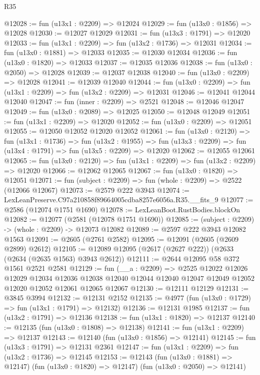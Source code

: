\begin{lexlean}{R35}
\begin{coremodule}
@12028 := fun (u13x1 : @2209) => @12024
@12029 := fun (u13x0 : @1856) => @12028
@12030 := @12027 @12029
@12031 := fun (u13x3 : @1791) => @12020
@12033 := fun (u13x1 : @2209) => fun (u13x2 : @1736) => @12031
@12034 := fun (u13x0 : @1881) => @12033
@12035 := @12030 @12034
@12036 := fun (u13x0 : @1820) => @12033
@12037 := @12035 @12036
@12038 := fun (u13x0 : @2050) => @12028
@12039 := @12037 @12038
@12040 := fun (u13x0 : @2209) => @12028
@12041 := @12039 @12040
@12044 := fun (u13x0 : @2209) => fun (u13x1 : @2209) => fun (u13x2 : @2209) => @12031
@12046 := @12041 @12044 @12040
@12047 := fun (inner : @2209) => @2521
@12048 := @12046 @12047
@12049 := fun (u13x0 : @2089) => @12025
@12050 := @12048 @12049
@12051 := fun (u13x1 : @2209) => @12020
@12052 := fun (u13x0 : @2209) => @12051
@12055 := @12050 @12052 @12020 @12052
@12061 := fun (u13x0 : @2120) =>
  fun (u13x1 : @1736) =>
  fun (u13x2 : @1955) => fun (u13x3 : @2209) => fun (u13x4 : @1791) => fun (u13x5 : @2209) => @12020
@12062 := @12055 @12061
@12065 := fun (u13x0 : @2120) => fun (u13x1 : @2209) => fun (u13x2 : @2209) => @12020
@12066 := @12062 @12065
@12067 := fun (u13x0 : @1820) => @12051
@12071 := fun (subject : @2209) => fun (whole : @2209) => @2522 (@12066 @12067)
@12073 := @2579 @222 @3943
@12074 := LexLeanPreserve.C97a210858f89664005cdba8257e6056a.R35.__fits_9
@12077 := @2586 (@12074 @1751 @1690)
@12078 := LexLeanBoot.RustBodies.blockOn
@12082 := @12077 (@2581 (@12078 @1751 @1690))
@12085 := (subject : @2209) -> (whole : @2209) -> @12073 @12082
@12089 := @2597 @222 @3943 @12082 @1563
@12091 := @2605 (@2761 @2582)
@12095 := @12091 (@2605 (@2609 @2899) @2612)
@12105 := @12089 @12095 (@2617 (@2627 @222)) (@2633 (@2634 (@2635 @1563) @3943 @2612))
@12111 := @2644 @12095 @58 @372 @1561 @2521 @2581
@12129 := fun (__a : @2209) =>
  @2525
    @12022
    @12026
    @12029
    @12034
    @12036
    @12038
    @12040
    @12044
    @12040
    @12047
    @12049
    @12052
    @12020
    @12052
    @12061
    @12065
    @12067
@12130 := @12111 @12129
@12131 := @3845 @3994
@12132 := @12131 @2152
@12135 := @4977 (fun (u13x0 : @1729) => fun (u13x1 : @1791) => @12132)
@12136 := @12131 @1985
@12137 := fun (u13x2 : @1791) => @12136
@12138 := fun (u13x1 : @1820) => @12137
@12140 := @12135 (fun (u13x0 : @1808) => @12138)
@12141 := fun (u13x1 : @2209) => @12137
@12143 := @12140 (fun (u13x0 : @1856) => @12141)
@12145 := fun (u13x3 : @1791) => @12131 @2361
@12147 := fun (u13x1 : @2209) => fun (u13x2 : @1736) => @12145
@12153 := @12143
    (fun (u13x0 : @1881) => @12147)
    (fun (u13x0 : @1820) => @12147)
    (fun (u13x0 : @2050) => @12141)

\end{coremodule}
\end{lexlean}
